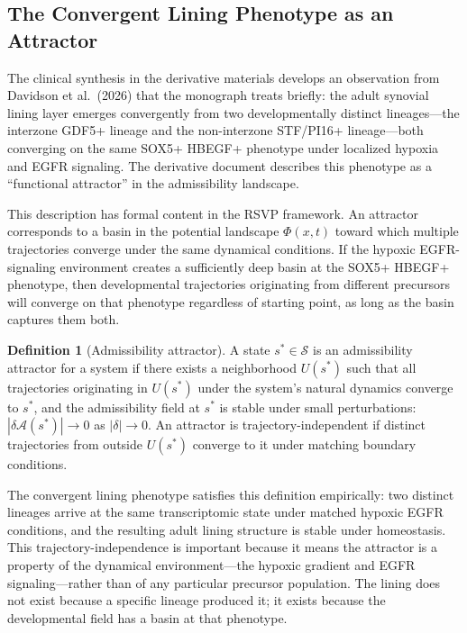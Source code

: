 \documentclass[12pt, a4paper]{article}
\theoremstyle{definition}
\newtheorem{defn}{Definition}[section]
\begin{document}
\subsection{The Convergent Lining Phenotype as an Attractor}

The clinical synthesis in the derivative materials develops an observation from Davidson et al.\ (2026) that the monograph treats briefly: the adult synovial lining layer emerges convergently from two developmentally distinct lineages---the interzone GDF5+ lineage and the non-interzone STF/PI16+ lineage---both converging on the same SOX5+ HBEGF+ phenotype under localized hypoxia and EGFR signaling. The derivative document describes this phenotype as a ``functional attractor'' in the admissibility landscape.

This description has formal content in the RSVP framework. An attractor corresponds to a basin in the potential landscape $\Phi(x,t)$ toward which multiple trajectories converge under the same dynamical conditions. If the hypoxic EGFR-signaling environment creates a sufficiently deep basin at the SOX5+ HBEGF+ phenotype, then developmental trajectories originating from different precursors will converge on that phenotype regardless of starting point, as long as the basin captures them both.

\begin{defn}[Admissibility attractor]
A state $s^* \in \mathcal{S}$ is an admissibility attractor for a system if there exists a neighborhood $U(s^*)$ such that all trajectories originating in $U(s^*)$ under the system's natural dynamics converge to $s^*$, and the admissibility field at $s^*$ is stable under small perturbations: $|\delta\mathcal{A}(s^*)| \to 0$ as $|\delta| \to 0$. An attractor is trajectory-independent if distinct trajectories from outside $U(s^*)$ converge to it under matching boundary conditions.
\end{defn}

The convergent lining phenotype satisfies this definition empirically: two distinct lineages arrive at the same transcriptomic state under matched hypoxic EGFR conditions, and the resulting adult lining structure is stable under homeostasis. This trajectory-independence is important because it means the attractor is a property of the dynamical environment---the hypoxic gradient and EGFR signaling---rather than of any particular precursor population. The lining does not exist because a specific lineage produced it; it exists because the developmental field has a basin at that phenotype.
\end{document}
